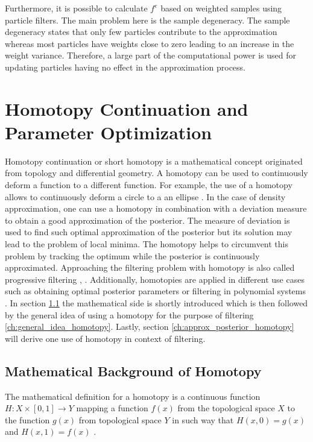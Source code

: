 \documentclass[a4paper]{IEEEtran}
\begin{document}
Furthermore, it is possible to calculate $f^{e}$ based on weighted samples using particle filters. The main problem here is the sample degeneracy. The sample degeneracy states that only few particles contribute to the approximation whereas most particles 
have weights close to zero \cite{arulampalam2002} leading to an increase in the weight variance. Therefore, a large part of the computational power is used for updating particles having no effect in the approximation process.


\section{Homotopy Continuation and Parameter Optimization}
\label{ch:homotopy_continuation}

Homotopy continuation or short homotopy is a mathematical concept originated from topology and differential geometry. A homotopy can be used to continuously deform a function to a different function. For example, the use of a homotopy allows to continuously deform a
circle to a an ellipse \cite{liao2012}. In the case of density approximation, one can use a homotopy in combination with a deviation measure to obtain a good approximation of the posterior. The measure of deviation is used to find such optimal approximation of the posterior but its solution may lead to the problem of local minima.
The homotopy helps to circumvent this problem by tracking the optimum while the posterior is continuously approximated.
Approaching the filtering problem with homotopy is also called progressive filtering \cite{hanebeck2003}, \cite{hanebeck2012a}. Additionally, homotopies are applied in different use cases such as obtaining optimal posterior parameters \cite{hagmar2011} or filtering in polynomial systems \cite{huber}.
In section \ref{ch:math_background_homotopy} the mathematical side is shortly introduced which is then followed by the general idea of using a homotopy for the purpose of filtering \ref{ch:general_idea_homotopy}. 
Lastly, section \ref{ch:approx_posterior_homotopy} will derive one use of homotopy in context of filtering.

\subsection{Mathematical Background of Homotopy}
\label{ch:math_background_homotopy}
The mathematical definition for a homotopy is a continuous function $H:X \times [0,1] \rightarrow Y$ mapping a function $f(x)$ from the topological space $X$ to the function $g(x)$ from topological space $Y$ in such way 
that $H(x,0)=g(x)$ and $H(x,1)=f(x)$ \cite{liao2012}. 
\end{document}
